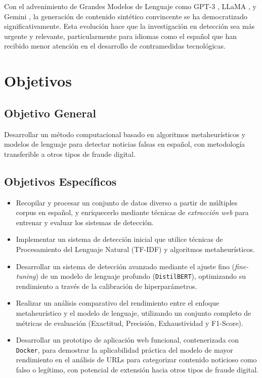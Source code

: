 Con el advenimiento de Grandes Modelos de Lenguaje como GPT-3 \cite{brown2020language}, LLaMA \cite{touvron2023llama}, y Gemini \cite{gemini2023family}, la generación de contenido sintético convincente se ha democratizado significativamente. Esta evolución hace que la investigación en detección sea más urgente y relevante, particularmente para idiomas como el español que han recibido menor atención en el desarrollo de contramedidas tecnológicas.

\section{Objetivos}

\subsection*{Objetivo General}
Desarrollar un método computacional basado en algoritmos metaheurísticos y modelos de lenguaje para detectar noticias falsas en español, con metodología transferible a otros tipos de fraude digital.

\subsection*{Objetivos Específicos}

\begin{itemize}
    \item Recopilar y procesar un conjunto de datos diverso a partir de múltiples corpus en español, y enriquecerlo mediante técnicas de \textit{extracción web} para entrenar y evaluar los sistemas de detección.
    
    \item Implementar un sistema de detección inicial que utilice técnicas de Procesamiento del Lenguaje Natural (TF-IDF) y algoritmos metaheurísticos.
    
    \item Desarrollar un sistema de detección avanzado mediante el ajuste fino (\textit{fine-tuning}) de un modelo de lenguaje profundo (\texttt{DistilBERT}), optimizando su rendimiento a través de la calibración de hiperparámetros.
    
    \item Realizar un análisis comparativo del rendimiento entre el enfoque metaheurístico y el modelo de lenguaje, utilizando un conjunto completo de métricas de evaluación (Exactitud, Precisión, Exhaustividad y F1-Score).
    
    \item Desarrollar un prototipo de aplicación web funcional, contenerizada con \texttt{Docker}, para demostrar la aplicabilidad práctica del modelo de mayor rendimiento en el análisis de URLs para categorizar contenido noticioso como falso o legítimo, con potencial de extensión hacia otros tipos de fraude digital.
\end{itemize}

